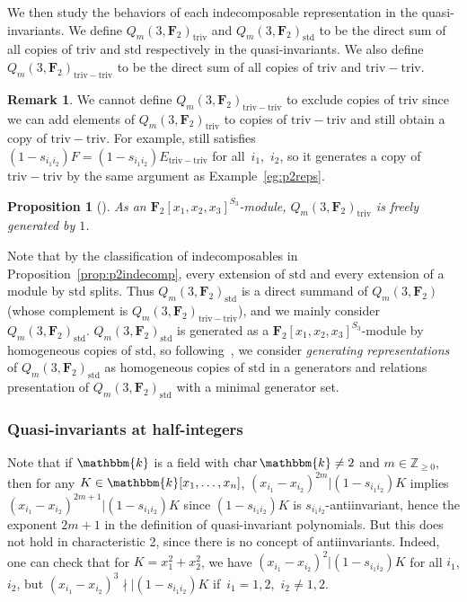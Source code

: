 \documentclass[pdftex]{sigma}
\newtheorem{Proposition}[Theorem]{Proposition}
\theoremstyle{definition}
\newtheorem{Remark}[Theorem]{Remark}
\numberwithin{equation}{section}
\renewcommand{\k}{\mathbbm{k}}
\newcommand{\Z}{\mathbb{Z}}
\newcommand{\triv}{\mathrm{triv}}
\newcommand{\std}{\mathrm{std}}
\newcommand{\trtr}{\mathrm{triv-triv}}
\begin{document}
We then study the behaviors of each indecomposable representation in the quasi-invariants. We define $Q_m(3,\mathbf{F}_2)_{\triv}$ and $Q_m(3,\mathbf{F}_2)_{\std}$ to be the direct sum of all copies of $\triv$ and $\std$ respectively in the quasi-invariants. We also define $Q_m(3,\mathbf{F}_2)_\trtr$ to be the direct sum of all copies of $\triv$ and $\trtr$.

\begin{Remark}
 We cannot define $Q_m(3,\mathbf{F}_2)_\trtr$ to exclude copies of $\triv$ since we can add elements of $Q_m(3,\mathbf{F}_2)_\triv$ to copies of $\trtr$ and still obtain a copy of $\trtr$. For example, \smash{$F:=E_\trtr+x_1^3+x_2^3+x_3^3$} still satisfies $(1-s_{i_1i_2})F=(1-s_{i_1i_2})E_\trtr$ for all~$i_1$,~$i_2$, so it generates a copy of $\trtr$ by the same argument as Example~\ref{eg:p2reps}.
\end{Remark}

\begin{Proposition}[{\cite{wang2022explicit}}]\label{prop:p2triv}
 As an $\mathbf{F}_2[x_1,x_2,x_3]^{S_3}$-module, $Q_m(3,\mathbf{F}_2)_{\triv}$ is freely generated by $1$.
\end{Proposition}

Note that by the classification of indecomposables in Proposition~\ref{prop:p2indecomp}, every extension of $\std$ and every extension of a module by $\std$ splits. Thus $Q_m(3,\mathbf{F}_2)_\std$ is a direct summand of $Q_m(3,\mathbf{F}_2)$ (whose complement is $Q_m(3,\mathbf{F}_2)_\trtr$), and we mainly consider $Q_m(3,\mathbf{F}_2)_\std$. $Q_m(3,\mathbf{F}_2)_{\std}$ is generated as a $\mathbf{F}_2[x_1,x_2,x_3]^{S_3}$-module by homogeneous copies of $\std$, so following~\cite{wang2022explicit}, we consider \textit{generating representations} of $Q_m(3,\mathbf{F}_2)_\std$ as homogeneous copies of $\std$ in a generators and relations presentation of $Q_m(3,\mathbf{F}_2)_{\std}$ with a minimal generator set.

\subsubsection{Quasi-invariants at half-integers}

Note that if $\k$ is a field with $\mathrm{char\,}\k\neq 2$ and $m\in\Z_{\geq 0}$, then for any $K\in\k[x_1,\dots,x_n]$, $(x_{i_1}-x_{i_2})^{2m}|(1-s_{i_1i_2})K$ implies $(x_{i_1}-x_{i_2})^{2m+1}|(1-s_{i_1i_2})K$ since $(1-s_{i_1i_2})K$ is $s_{i_1i_2}$-antiinvariant, hence the exponent $2m+1$ in the definition of quasi-invariant polynomials. But this does not hold in characteristic 2, since there is no concept of antiinvariants. Indeed, one can check that for $K=x_1^2+x_2^2$, we have $(x_{i_1}-x_{i_2})^2|(1-s_{i_1i_2})K$ for all $i_1$, $i_2$, but $(x_{i_1}-x_{i_2})^3\nmid|(1-s_{i_1i_2})K$ if~$i_1=1,2$,~$i_2\neq 1,2$.
\end{document}
